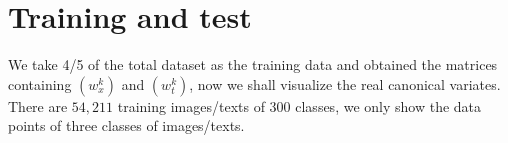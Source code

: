 \documentclass[12pt]{report}	%
\begin{document}
\section{Training and test}


We take 4/5 of the total dataset as the training data and obtained the matrices containing $(w_x^k)$ and $(w_t^k)$, now we shall visualize the real canonical variates. There are $54,211$ training images/texts of 300 classes, we only show the data points of three classes of images/texts.



\begin{figure}[H]
        \centering
\end{figure}
\end{document}
